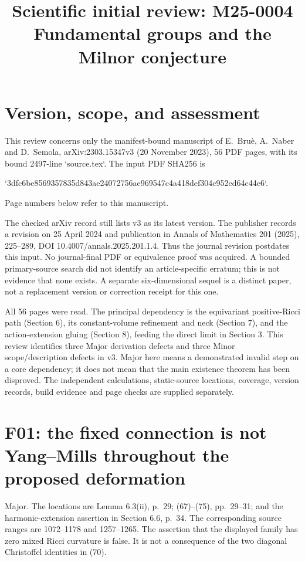 \documentclass[10pt]{article}
\title{Scientific initial review: M25-0004
Fundamental groups and the Milnor conjecture}
\author{}
\date{}
\begin{document}
\maketitle
\section*{Version, scope, and assessment}
This review concerns only the manifest-bound manuscript of E. Bruè, A. Naber and D. Semola, arXiv:2303.15347v3 (20 November 2023), 56 PDF pages, with its bound 2497-line `source.tex`. The input PDF SHA256 is\par
`3dfc6be8569357835d843ae24072756ae969547c4a418def304c952ed64c44e6`.\par
Page numbers below refer to this manuscript.\par
The checked arXiv record still lists v3 as its latest version. The publisher records a revision on 25 April 2024 and publication in Annals of Mathematics 201 (2025), 225–289, DOI 10.4007/annals.2025.201.1.4. Thus the journal revision postdates this input. No journal-final PDF or equivalence proof was acquired. A bounded primary-source search did not identify an article-specific erratum; this is not evidence that none exists. A separate six-dimensional sequel is a distinct paper, not a replacement version or correction receipt for this one.\par
All 56 pages were read. The principal dependency is the equivariant positive-Ricci path (Section 6), its constant-volume refinement and neck (Section 7), and the action-extension gluing (Section 8), feeding the direct limit in Section 3. This review identifies three Major derivation defects and three Minor scope/description defects in v3. Major here means a demonstrated invalid step on a core dependency; it does not mean that the main existence theorem has been disproved. The independent calculations, static-source locations, coverage, version records, build evidence and page checks are supplied separately.\par
\section*{F01: the fixed connection is not Yang–Mills throughout the proposed deformation}
Major. The locations are Lemma 6.3(ii), p. 29; (67)–(75), pp. 29–31; and the harmonic-extension assertion in Section 6.6, p. 34. The corresponding source ranges are 1072–1178 and 1257–1265. The assertion that the displayed family has zero mixed Ricci curvature is false. It is not a consequence of the two diagonal Christoffel identities in (70).\par
\end{document}

